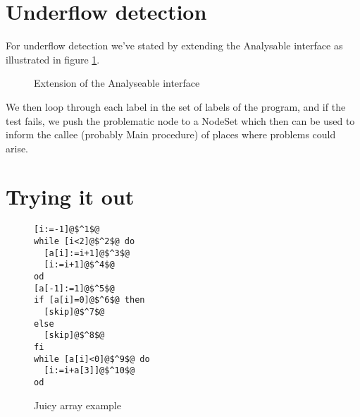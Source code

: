 \section{Underflow detection}

For underflow detection we've stated by extending the Analysable interface as illustrated in figure \ref{fig:analysable_underflow_extension}.
\begin{figure}
\centering
{}
\caption{Extension of the Analyseable interface}
\label{fig:analysable_underflow_extension}
\end{figure}

We then loop through each label in the set of labels of the program, and if the test fails, we push the problematic node to a NodeSet which then can be used to inform the callee (probably Main procedure) of places where problems could arise.




\section{Trying it out}
\begin{figure}
  \begin{lstlisting}
[i:=-1]@$^1$@
while [i<2]@$^2$@ do
  [a[i]:=i+1]@$^3$@
  [i:=i+1]@$^4$@
od
[a[-1]:=1]@$^5$@
if [a[i]=0]@$^6$@ then
  [skip]@$^7$@
else
  [skip]@$^8$@
fi
while [a[i]<0]@$^9$@ do
  [i:=i+a[3]]@$^10$@
od
 \end{lstlisting}
 \caption{Juicy array example}
\label{code:juicy_array_example}
\end{figure}

